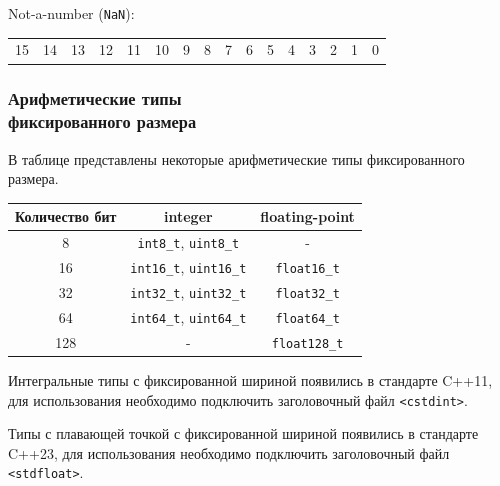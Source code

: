\documentclass[compress, 8pt, aspectratio=169]{beamer}
\newenvironment{sixteenbit}{%
    \begin{center}
        \begin{tabular}{ |m{0.2cm}|m{0.2cm}|m{0.2cm}|m{0.2cm}|m{0.2cm}|m{0.2cm}|m{0.2cm}|m{0.2cm}|m{0.2cm}|m{0.2cm}|m{0.2cm}|m{0.2cm}|m{0.2cm}|m{0.2cm}|m{0.2cm}|m{0.2cm}|  }
            \hline
}{
        \hline
        \multicolumn{1}{c}{\color{gray}\tiny{15}} &
        \multicolumn{1}{c}{\color{gray}\tiny{14}} &
        \multicolumn{1}{c}{\color{gray}\tiny{13}} &
        \multicolumn{1}{c}{\color{gray}\tiny{12}} &
        \multicolumn{1}{c}{\color{gray}\tiny{11}} &
        \multicolumn{1}{c}{\color{gray}\tiny{10}} &
        \multicolumn{1}{c}{\color{gray}\tiny{9}} &
        \multicolumn{1}{c}{\color{gray}\tiny{8}} &
        \multicolumn{1}{c}{\color{gray}\tiny{7}} &
        \multicolumn{1}{c}{\color{gray}\tiny{6}} &
        \multicolumn{1}{c}{\color{gray}\tiny{5}} &
        \multicolumn{1}{c}{\color{gray}\tiny{4}} &
        \multicolumn{1}{c}{\color{gray}\tiny{3}} &
        \multicolumn{1}{c}{\color{gray}\tiny{2}} &
        \multicolumn{1}{c}{\color{gray}\tiny{1}} &
        \multicolumn{1}{c}{\color{gray}\tiny{0}} \\
        \end{tabular}
    \end{center}
}
\begin{document}
\begin{frame}[fragile]
    Not-a-number (\verb|NaN|):

    \begin{sixteenbit}
        \cellcolor{blue!40!white}{0} &
        \cellcolor{green!40!white}{1} &
        \cellcolor{green!40!white}{1} &
        \cellcolor{green!40!white}{1} &
        \cellcolor{green!40!white}{1} &
        \cellcolor{green!40!white}{1} &
        \cellcolor{red!40!white}{0} &
        \cellcolor{red!40!white}{0} &
        \cellcolor{red!40!white}{0} &
        \cellcolor{red!40!white}{0} &
        \cellcolor{red!40!white}{0} &
        \cellcolor{red!40!white}{0} &
        \cellcolor{red!40!white}{0} &
        \cellcolor{red!40!white}{0} &
        \cellcolor{red!40!white}{0} &
        \cellcolor{red!40!white}{1} \\
    \end{sixteenbit}

\end{frame}

\begin{frame}[fragile]

    \frametitle{Арифметические типы \\ фиксированного размера}

    В таблице представлены некоторые арифметические типы
    фиксированного размера.

    \begin{table}[H]
        \begin{threeparttable}
            \begin{tabular}{|c|c|c|}
                \hline
                Количество бит & integer & floating-point \\
                \hline
                \hline
                8 & \verb|int8_t|\tnote{*}, \verb|uint8_t| & - \\
                16 & \verb|int16_t|, \verb|uint16_t| & \verb|float16_t|\tnote{**} \\
                32 & \verb|int32_t|, \verb|uint32_t| & \verb|float32_t| \\
                64 & \verb|int64_t|, \verb|uint64_t| & \verb|float64_t| \\
                128 & - & \verb|float128_t| \\
                \hline
            \end{tabular}
            \begin{tablenotes}
            \small
            \item[*] Интегральные типы с фиксированной шириной появились
                в стандарте C++11, для использования необходимо подключить
                заголовочный файл \verb|<cstdint>|.
            \item[**] Типы с плавающей точкой с фиксированной шириной появились
                в стандарте C++23, для использования необходимо подключить
                заголовочный файл \verb|<stdfloat>|.
            \end{tablenotes}
        \end{threeparttable}
    \end{table}

\end{frame}
\end{document}
